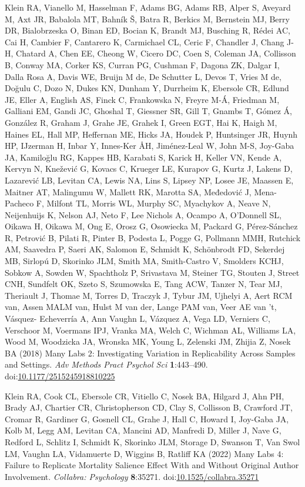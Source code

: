 \documentclass[
  english,
  a4paper,
]{article}
\newlength{\cslhangindent}
\newlength{\cslentryspacingunit} %
\newenvironment{CSLReferences}[2] %
 {%
  \setlength{\parindent}{0pt}
  \ifodd #1
  \let\oldpar\par
  \def\par{\hangindent=\cslhangindent\oldpar}
  \fi
  \setlength{\parskip}{#2\cslentryspacingunit}
 }%
 {}
\begin{document}
\begin{CSLReferences}{1}{0}
\leavevmode{}%
Klein RA, Vianello M, Hasselman F, Adams BG, Adams RB, Alper S, Aveyard M, Axt JR, Babalola MT, Bahník Š, Batra R, Berkics M, Bernstein MJ, Berry DR, Bialobrzeska O, Binan ED, Bocian K, Brandt MJ, Busching R, Rédei AC, Cai H, Cambier F, Cantarero K, Carmichael CL, Ceric F, Chandler J, Chang J-H, Chatard A, Chen EE, Cheong W, Cicero DC, Coen S, Coleman JA, Collisson B, Conway MA, Corker KS, Curran PG, Cushman F, Dagona ZK, Dalgar I, Dalla Rosa A, Davis WE, Bruijn M de, De Schutter L, Devos T, Vries M de, Doğulu C, Dozo N, Dukes KN, Dunham Y, Durrheim K, Ebersole CR, Edlund JE, Eller A, English AS, Finck C, Frankowska N, Freyre M-Á, Friedman M, Galliani EM, Gandi JC, Ghoshal T, Giessner SR, Gill T, Gnambs T, Gómez Á, González R, Graham J, Grahe JE, Grahek I, Green EGT, Hai K, Haigh M, Haines EL, Hall MP, Heffernan ME, Hicks JA, Houdek P, Huntsinger JR, Huynh HP, IJzerman H, Inbar Y, Innes-Ker ÅH, Jiménez-Leal W, John M-S, Joy-Gaba JA, Kamiloğlu RG, Kappes HB, Karabati S, Karick H, Keller VN, Kende A, Kervyn N, Knežević G, Kovacs C, Krueger LE, Kurapov G, Kurtz J, Lakens D, Lazarević LB, Levitan CA, Lewis NA, Lins S, Lipsey NP, Losee JE, Maassen E, Maitner AT, Malingumu W, Mallett RK, Marotta SA, Međedović J, Mena-Pacheco F, Milfont TL, Morris WL, Murphy SC, Myachykov A, Neave N, Neijenhuijs K, Nelson AJ, Neto F, Lee Nichols A, Ocampo A, O'Donnell SL, Oikawa H, Oikawa M, Ong E, Orosz G, Osowiecka M, Packard G, Pérez-Sánchez R, Petrović B, Pilati R, Pinter B, Podesta L, Pogge G, Pollmann MMH, Rutchick AM, Saavedra P, Saeri AK, Salomon E, Schmidt K, Schönbrodt FD, Sekerdej MB, Sirlopú D, Skorinko JLM, Smith MA, Smith-Castro V, Smolders KCHJ, Sobkow A, Sowden W, Spachtholz P, Srivastava M, Steiner TG, Stouten J, Street CNH, Sundfelt OK, Szeto S, Szumowska E, Tang ACW, Tanzer N, Tear MJ, Theriault J, Thomae M, Torres D, Traczyk J, Tybur JM, Ujhelyi A, Aert RCM van, Assen MALM van, Hulst M van der, Lange PAM van, Veer AE van 't, Vásquez- Echeverría A, Ann Vaughn L, Vázquez A, Vega LD, Verniers C, Verschoor M, Voermans IPJ, Vranka MA, Welch C, Wichman AL, Williams LA, Wood M, Woodzicka JA, Wronska MK, Young L, Zelenski JM, Zhijia Z, Nosek BA (2018) Many {Labs} 2: {Investigating Variation} in {Replicability Across Samples} and {Settings}. \emph{Adv Methods Pract Psychol Sci} \textbf{1}:443--490. doi:\href{https://doi.org/10.1177/2515245918810225}{10.1177/2515245918810225}

\leavevmode{}%
Klein RA, Cook CL, Ebersole CR, Vitiello C, Nosek BA, Hilgard J, Ahn PH, Brady AJ, Chartier CR, Christopherson CD, Clay S, Collisson B, Crawford JT, Cromar R, Gardiner G, Gosnell CL, Grahe J, Hall C, Howard I, Joy-Gaba JA, Kolb M, Legg AM, Levitan CA, Mancini AD, Manfredi D, Miller J, Nave G, Redford L, Schlitz I, Schmidt K, Skorinko JLM, Storage D, Swanson T, Van Swol LM, Vaughn LA, Vidamuerte D, Wiggins B, Ratliff KA (2022) Many {Labs} 4: {Failure} to {Replicate Mortality Salience Effect With} and {Without Original Author Involvement}. \emph{Collabra: Psychology} \textbf{8}:35271. doi:\href{https://doi.org/10.1525/collabra.35271}{10.1525/collabra.35271}


\end{CSLReferences}
\end{document}
